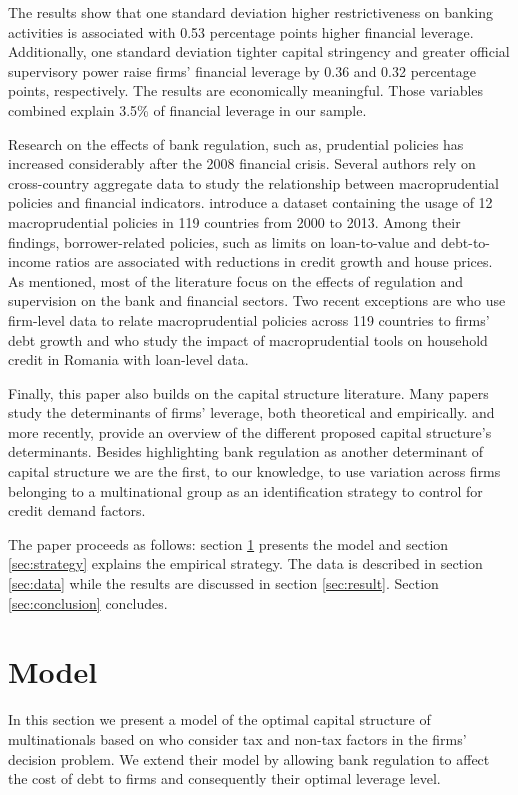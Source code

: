 \documentclass[12pt]{article}
\begin{document}
	The results show that one standard deviation higher restrictiveness on banking activities is associated with 0.53 percentage points higher financial leverage. Additionally, one standard deviation tighter capital stringency and greater official supervisory power raise firms' financial leverage by 0.36 and 0.32 percentage points, respectively. The results are economically meaningful. Those variables combined explain 3.5\% of financial leverage in our sample.
	
	Research on the effects of bank regulation, such as, prudential policies has increased considerably after the 2008 financial crisis. Several authors rely on cross-country aggregate data to study the relationship between macroprudential policies and financial indicators. \cite*{cerutti2017use} introduce a dataset containing the usage of 12 macroprudential policies in 119 countries from 2000 to 2013. Among their findings, borrower-related policies, such as limits on loan-to-value and debt-to-income ratios are associated with reductions in credit growth and house prices. As mentioned, most of the literature focus on the effects of regulation and supervision on the bank and financial sectors. Two recent exceptions are \cite*{ayyagari2017credit} who use firm-level data to relate macroprudential policies across 119 countries to firms' debt growth and \cite*{epure2017household} who study the impact of macroprudential tools on household credit in Romania with loan-level data.
	
	Finally, this paper also builds on the capital structure literature. Many papers study the determinants of firms' leverage, both theoretical and empirically. \cite*{titman1988determinants} and more recently, \cite*{oztekin2015capital} provide an overview of the different proposed capital structure's determinants. Besides highlighting bank regulation as another determinant of capital structure we are the first, to our knowledge, to use variation across firms belonging to a multinational group as an identification strategy to control for credit demand factors.
	
	The paper proceeds as follows: section \ref{sec:model} presents the model and section \ref{sec:strategy} explains the empirical strategy. The data is described in section \ref{sec:data} while the results are discussed in section \ref{sec:result}. Section \ref{sec:conclusion} concludes.
	
		\section{Model} \label{sec:model}
	In this section we present a model of the optimal capital structure of multinationals based on \cite{huizinga2008capital} who consider tax and non-tax factors in the firms' decision problem. We extend their model by allowing bank regulation to affect the cost of debt to firms and consequently their optimal leverage level.
	
\end{document}
